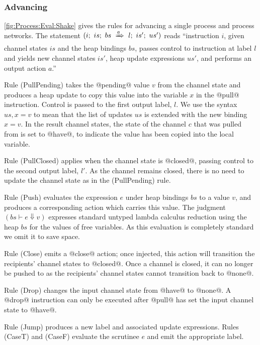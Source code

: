 


\subsubsection{Advancing}
\autoref{fig:Process:Eval:Shake} gives the rules for advancing a single process and process networks.
The statement $(i;~is;~bs~\xRightarrow{a}~l;~is';~us')$ reads ``instruction $i$, given channel states $is$ and the heap bindings $bs$, passes control to instruction at label $l$ and yields new channel states $is'$, heap update expressions $us'$, and performs an output action $a$.''

Rule (PullPending) takes the @pending@ value $v$ from the channel state and produces a heap update to copy this value into the variable $x$ in the @pull@ instruction.
Control is passed to the first output label, $l$.
We use the syntax $us,x=v$ to mean that the list of updates $us$ is extended with the new binding $x=v$.
In the result channel states, the state of the channel $c$ that was pulled from is set to @have@, to indicate the value has been copied into the local variable.

Rule (PullClosed) applies when the channel state is @closed@, passing control to the second output label, $l'$.
As the channel remains closed, there is no need to update the channel state as in the (PullPending) rule.

Rule (Push) evaluates the expression $e$ under heap bindings $bs$ to a value $v$, and produces a corresponding action which carries this value.
The judgment $(bs \vdash e \Downarrow v)$ expresses standard untyped lambda calculus reduction using the heap $bs$ for the values of free variables. As this evaluation is completely standard we omit it to save space.

Rule (Close) emits a @close@ action; once injected, this action will transition the recipients' channel states to @closed@.
Once a channel is closed, it can no longer be pushed to as the recipients' channel states cannot transition back to @none@.

Rule (Drop) changes the input channel state from @have@ to @none@. A @drop@ instruction can only be executed after @pull@ has set the input channel state to @have@.

Rule (Jump) produces a new label and associated update expressions. Rules (CaseT) and (CaseF) evaluate the scrutinee $e$ and emit the appropriate label.

